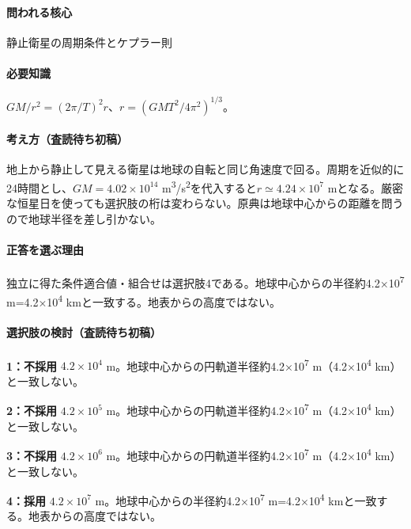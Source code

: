\paragraph{問われる核心} 静止衛星の周期条件とケプラー則

\paragraph{必要知識} \(GM/r^2=(2\pi/T)^2r\)、\(r=(GMT^2/4\pi^2)^{1/3}\)。

\paragraph{考え方（査読待ち初稿）} 地上から静止して見える衛星は地球の自転と同じ角速度で回る。周期を近似的に24時間とし、\(GM=4.02\times10^{14}\) m\textsuperscript{3}/s\textsuperscript{2}を代入すると\(r\simeq4.24\times10^7\) mとなる。厳密な恒星日を使っても選択肢の桁は変わらない。原典は地球中心からの距離を問うので地球半径を差し引かない。

\paragraph{正答を選ぶ理由} 独立に得た条件適合値・組合せは選択肢4である。地球中心からの半径約4.2×10\textsuperscript{7} m=\allowbreak{}4.2×10\textsuperscript{4} kmと一致する。地表からの高度ではない。

\paragraph{選択肢の検討（査読待ち初稿）}\mbox{}\par

\noindent\textbf{1：不採用} \(4.2\times10^4\) m。地球中心からの円軌道半径約4.2×10\textsuperscript{7} m（4.2×10\textsuperscript{4} km）と一致しない。\par

\noindent\textbf{2：不採用} \(4.2\times10^5\) m。地球中心からの円軌道半径約4.2×10\textsuperscript{7} m（4.2×10\textsuperscript{4} km）と一致しない。\par

\noindent\textbf{3：不採用} \(4.2\times10^6\) m。地球中心からの円軌道半径約4.2×10\textsuperscript{7} m（4.2×10\textsuperscript{4} km）と一致しない。\par

\noindent\textbf{4：採用} \(4.2\times10^7\) m。地球中心からの半径約4.2×10\textsuperscript{7} m=\allowbreak{}4.2×10\textsuperscript{4} kmと一致する。地表からの高度ではない。\par

